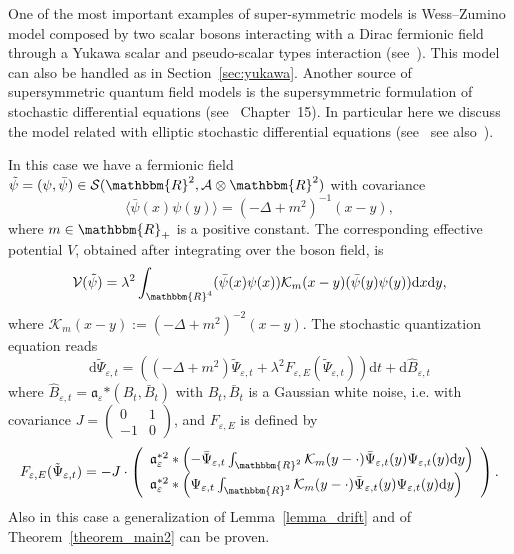 \documentclass[11pt]{article}
\newcommand{\assign}{:=}
\newcommand{\asterisk}{\mathord{*}}
\newcommand{\mathd}{\mathrm{d}}
\begin{document}
One of the most important examples of super-symmetric models is Wess--Zumino
model composed by two scalar bosons interacting with a Dirac fermionic field
through a Yukawa scalar and pseudo-scalar types interaction
(see~{\cite{Jaffe_supersymmetry,Arai_supersymmetry,haba_supersymmetry_1995}}).
This model can also be handled as in Section~\ref{sec:yukawa}. Another source
of supersymmetric quantum field models is the supersymmetric formulation of
stochastic differential equations (see~{\cite{ZinnJustin}} Chapter~15). In
particular here we discuss the model related with elliptic stochastic
differential equations
(see~{\cite{klein_supersymmetry_1983,klein_supersymmetry_1985,albeverio_elliptic_2018}}
see also~{\cite{de_vecchi_note_2019}}).

In this case we have a fermionic field $\tilde{\psi} = (\psi, \bar{\psi}) \in
\mathcal{S} (\mathbbm{R}^2, \mathcal{A} \otimes \mathbbm{R}^2)$ with covariance
\[ \langle \bar{\psi} (x) \psi (y) \rangle = (- \Delta + m^2)^{- 1} (x - y),
\]
where $m \in \mathbbm{R}_+$ is a positive constant. The corresponding effective
potential $V$, obtained after integrating over the boson field, is
\[ \mathcal{V} (\tilde{\psi}) = \lambda^2 \int_{\mathbbm{R}^4} (\bar{\psi} (x)
   \psi (x)) \mathcal{K}_m (x - y) (\bar{\psi} (y) \psi (y)) \mathd x \mathd
   y, \]
where $\mathcal{K}_m (x - y) \assign (- \Delta + m^2)^{- 2} (x - y)$. The
stochastic quantization equation reads
\begin{equation}
  \mathd \tilde{\Psi}_{\varepsilon, t} = ((- \Delta + m^2)
  \tilde{\Psi}_{\varepsilon, t} + \lambda^2 F_{\varepsilon, E}
  (\tilde{\Psi}_{\varepsilon, t})) \mathd t + \mathd \hat{B}_{\varepsilon, t}
  \label{eq:elliptic}
\end{equation}
where $\hat{B}_{\varepsilon, t} = \mathfrak{a}_{\varepsilon} \asterisk (B_t,
\bar{B}_t)$ with $B_t, \bar{B}_t$ is a Gaussian white noise, i.e. with
covariance $J = \left( \begin{array}{ll}
  0 & 1\\
  - 1 & 0
\end{array} \right)$, and $F_{\varepsilon, E}$ is defined by
\begin{equation}
  F_{\varepsilon, E} (\tilde{\Psi}_{\varepsilon, t}) = - J \cdot \left(
  \begin{array}{l}
    \mathfrak{a}_{\varepsilon}^{\asterisk 2} \ast \left( -
    \bar{\Psi}_{\varepsilon, t} \int_{\mathbbm{R}^2} \mathcal{K}_m (y - \cdot)
    \bar{\Psi}_{\varepsilon, t} (y) \Psi_{\varepsilon, t} (y) \mathd y
    \right)\\
    \mathfrak{a}_{\varepsilon}^{\asterisk 2} \ast \left( \Psi_{\varepsilon, t}
    \int_{\mathbbm{R}^2} \mathcal{K}_m (y - \cdot) \bar{\Psi}_{\varepsilon, t}
    (y) \Psi_{\varepsilon, t} (y) \mathd y \right)
  \end{array} \right) . \label{eq:elliptic2}
\end{equation}
Also in this case a generalization of Lemma~\ref{lemma_drift} and of
Theorem~\ref{theorem_main2} can be proven.
\end{document}
